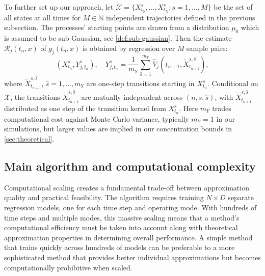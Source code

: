 \documentclass[11pt,reqno,a4paper]{amsart}
\theoremstyle{definition}
\numberwithin{equation}{section}
\DeclareMathOperator{\1}{\mathbbm{1}}
\begin{document}
To further set up our approach, let $\mathcal{X} = \{X^{s}_{t_0},\ldots,X^{s}_{t_N}; s=1,\ldots,M\}$ be the set of all states at all times for $M \in \mathbb{N}$ independent trajectories defined in the previous subsection. The processes' starting points are drawn from a distribution $\mu_0$ which is assumed to be sub-Gaussian, see \cref{def:sub-gaussian}. Then the estimate $\mathcal{R}_j(t_n,x)$ of $g_j(t_n,x)$ is obtained by regression over $M$ sample pairs:
\begin{equation}\label{eq:regressionPairs}
  (X_{t_n}^s, Y_{j,t_n}^s), \quad Y_{j,t_n}^s = \frac{1}{m_Y} \sum_{\hat{s}=1}^{m_Y}
    \widehat{V}_j(t_{n+1}, \widetilde{X}^{s,\hat{s}}_{t_{n+1}}),
\end{equation}
where $\widetilde{X}^{s,\hat s}_{t_{n+1}}$, $\hat{s} = 1,\dots,m_Y$ are one-step transitions starting in $X_{t_n}^s$. Conditional on $\mathcal{X}$, the transitions ${\widetilde X^{s,\hat s}_{t_{n+1}}}$ are mutually independent across $(n,s,\hat s)$, with $\widetilde X^{s,\hat s}_{t_{n+1}}$ distributed as one step of the transition kernel from $X^s_{t_n}$. Here $m_Y$ trades computational cost against Monte Carlo variance, typically $m_Y=1$ in our simulations, but larger values are implied in our concentration bounds in \cref{sec:theoretical}.
\subsection{Main algorithm and computational complexity}\label{sec:algorithm}
Computational scaling creates a fundamental trade-off between approximation quality and practical feasibility. The algorithm requires training $N \times D$ separate regression models, one for each time step and operating mode. With hundreds of time steps and multiple modes, this massive scaling means that a method's computational efficiency must be taken into account along with theoretical approximation properties in determining overall performance. A simple method that trains quickly across hundreds of models can be preferable to a more sophisticated method that provides better individual approximations but becomes computationally prohibitive when scaled.
\end{document}
